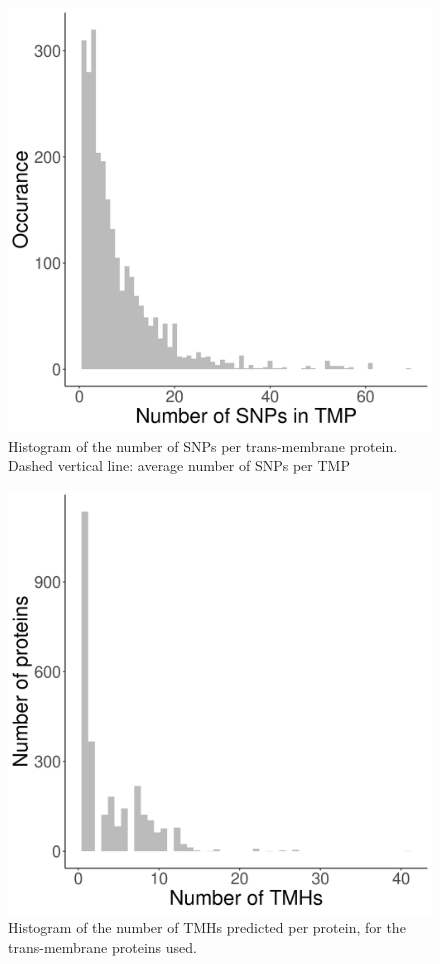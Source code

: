 \begin{figure}[!htbp]
  \includegraphics[width=\textwidth]{ncbi_peregrine_results/fig_n_snps_per_tmp.png}
  \caption{
    Histogram of the number of SNPs per trans-membrane protein.
    Dashed vertical line: average number of SNPs per TMP
  }
  \label{fig:fig_n_snps_per_tmp}
\end{figure}

\begin{figure}[!htbp]
  \includegraphics[width=\textwidth]{ncbi_peregrine_results/fig_n_tmhs_per_protein.png}
  \caption{
    Histogram of the number of TMHs predicted per protein,
    for the trans-membrane proteins used.
  }
  \label{fig:fig_n_tmhs_per_protein}
\end{figure}


